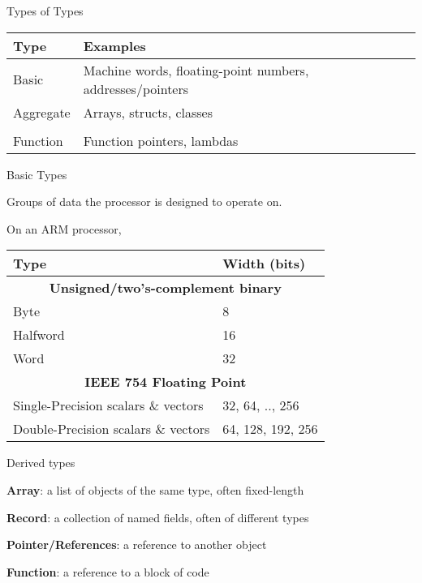 \documentclass{plt}
\begin{document}
\begin{frame}{Types of Types}

\begin{tabular}{lp{20pc}}
\toprule
\textbf{Type} & \textbf{Examples} \\
\midrule
Basic & {\raggedright Machine words, floating-point numbers, \break addresses/pointers\par} \\
Aggregate & Arrays, structs, classes \\
\\
Function & Function pointers, lambdas \\
\bottomrule
\end{tabular}

\end{frame}

\begin{frame}{Basic Types}

Groups of data the processor is designed to operate on.

On an ARM processor,

\begin{tabular}{ll}
\toprule
\textbf{Type} & \textbf{Width (bits)} \\
\midrule
\multicolumn{2}{c}{\textbf{Unsigned/two's-complement binary}} \\
\midrule
Byte & 8 \\
Halfword & 16 \\
Word & 32 \\
\midrule
\multicolumn{2}{c}{\textbf{IEEE 754 Floating Point}} \\
\midrule
Single-Precision scalars \& vectors & 32, 64, .., 256 \\
Double-Precision scalars \& vectors & 64, 128, 192, 256 \\
\bottomrule
\end{tabular}
\end{frame}

\begin{frame}{Derived types}

\textbf{Array}: a list of objects of the same type, often fixed-length

\textbf{Record}: a collection of named fields, often of different types

\textbf{Pointer/References}: a reference to another object

\textbf{Function}: a reference to a block of code

\end{frame}
\end{document}
